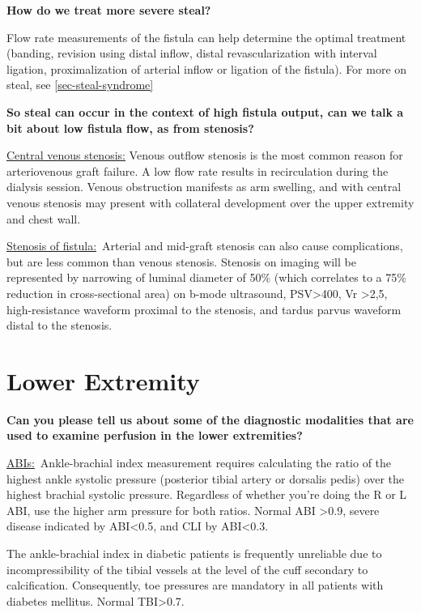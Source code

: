 \documentclass[
]{book}
\begin{document}
\textbf{How do we treat more severe steal?}

Flow rate measurements of the fistula can help determine the optimal
treatment (banding, revision using distal inflow, distal
revascularization with interval ligation, proximalization of arterial
inflow or ligation of the fistula). For more on steal, see
\ref{sec-steal-syndrome}

\textbf{So steal can occur in the context of high fistula output, can we talk
a bit about low fistula flow, as from stenosis?}

\uline{Central venous stenosis:} Venous outflow stenosis is the
most common reason for arteriovenous graft failure. A low flow rate
results in recirculation during the dialysis session. Venous obstruction
manifests as arm swelling, and with central venous stenosis may present
with collateral development over the upper extremity and chest wall.

\uline{Stenosis of fistula:}~Arterial and mid-graft stenosis can
also cause complications, but are less common than venous stenosis.
Stenosis on imaging will be represented by narrowing of luminal diameter
of 50\% (which correlates to a 75\% reduction in cross-sectional area) on
b-mode ultrasound, PSV\textgreater400, Vr \textgreater2,5, high-resistance waveform proximal
to the stenosis, and tardus parvus waveform distal to the
stenosis.\citep{bandyk2013}

\hypertarget{lower-extremity}{%
\section{Lower Extremity}\label{lower-extremity}}

\textbf{Can you please tell us about some of the diagnostic modalities that
are used to examine perfusion in the lower extremities?}

\uline{ABIs:}~Ankle-brachial index measurement requires
calculating the ratio of the highest ankle systolic pressure (posterior
tibial artery or dorsalis pedis) over the highest brachial systolic
pressure. Regardless of whether you're doing the R or L ABI, use the
higher arm pressure for both ratios. Normal ABI \textgreater0.9, severe disease
indicated by ABI\textless0.5, and CLI by ABI\textless0.3.

The ankle-brachial index in diabetic patients is frequently unreliable
due to incompressibility of the tibial vessels at the level of the cuff
secondary to calcification. Consequently, toe pressures are mandatory in
all patients with diabetes mellitus. Normal TBI\textgreater0.7.
\end{document}
